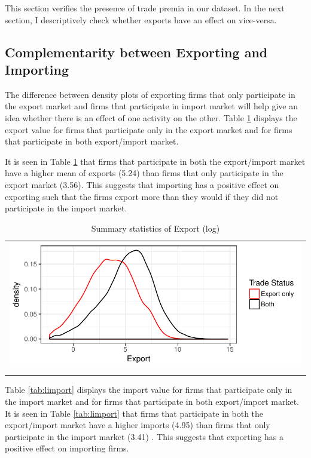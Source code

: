 \documentclass[11pt]{article}
\begin{document}
This section verifies the presence of trade premia in our dataset. In
the next section, I descriptively check whether exports have an effect
on vice-versa.  

\subsection{Complementarity between Exporting and Importing}
The difference between density plots of exporting firms that only participate in the
export market and firms that participate in import market will help
give an idea whether there is an effect of one activity on the other. 
Table \ref{tab:lexport} displays the export value for firms that participate only in the
export market and for firms that participate in both export/import
market. 

It is seen in Table \ref{tab:lexport} that firms that participate in both the
export/import market have a higher mean of exports (5.24) than firms that only
participate in the export market (3.56). This suggests that importing has a
positive effect on exporting such that the firms export more than they
would if they did not participate in the import market.     
\begin{center}
\begin{table}[htp]
\caption{Summary statistics of Export (log)}
\label{tab:lexport}
\begin{tabular}{c}
 \includegraphics{./PICS/denslexport.pdf}   \\ 
   \\  
\end{tabular}
\end{table}
\end{center}
Table \ref{tab:limport} displays the import value for firms that participate only in the
import market and for firms that participate in both export/import
market. 
It is seen in Table \ref{tab:limport} that firms that participate in both the
export/import market have a higher imports (4.95) than firms that only
participate in the import market (3.41) . This suggests that exporting has a
positive effect on importing firms. 
\end{document}
